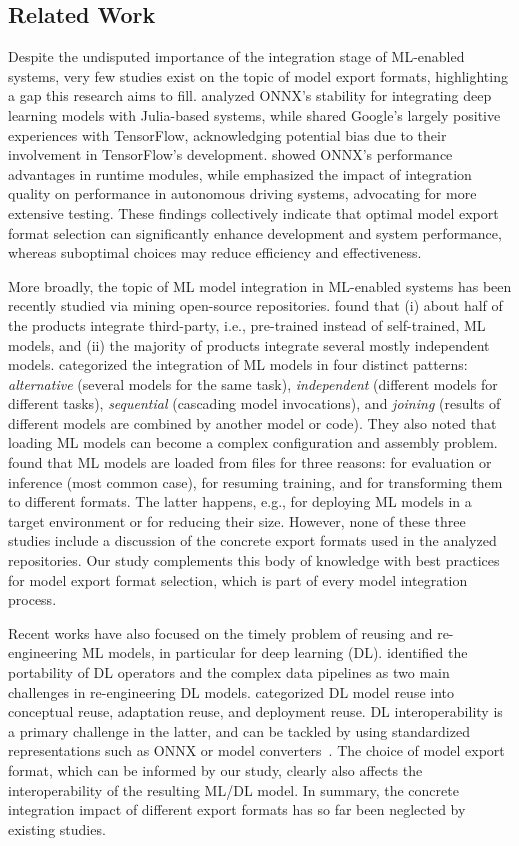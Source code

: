 \subsection{Related Work}
Despite the undisputed importance of the integration stage of ML-enabled systems, very few studies exist on the topic of model export formats, highlighting a gap this research aims to fill.
\citet{shridhar2020onnx} analyzed ONNX's stability for integrating deep learning models with Julia-based systems, while \citet{olston2017tensorflow} shared Google's largely positive experiences with TensorFlow, acknowledging potential bias due to their involvement in TensorFlow's development.
\citet{alizadeh2024green} showed ONNX's performance advantages in runtime modules, while \citet{peng2020first} emphasized the impact of integration quality on performance in autonomous driving systems, advocating for more extensive testing.
These findings collectively indicate that optimal model export format selection can significantly enhance development and system performance, whereas suboptimal choices may reduce efficiency and effectiveness.

More broadly, the topic of ML model integration in ML-enabled systems has been recently studied via mining open-source repositories.
\citet{nahar2024product} found that (i) about half of the products integrate third-party, i.e., pre-trained instead of self-trained, ML models, and (ii) the majority of products integrate several mostly independent models.
\citet{Sens2024} categorized the integration of ML models in four distinct patterns: \textit{alternative} (several models for the same task), \textit{independent} (different models for different tasks), \textit{sequential} (cascading model invocations), and \textit{joining} (results of different models are combined by another model or code). 
They also noted that loading ML models can become a complex configuration and assembly problem. 
\citet{Toma2024} found that ML models are loaded from files for three reasons: for evaluation or inference (most common case), for resuming training, and for transforming them to different formats.
The latter happens, e.g., for deploying ML models in a target environment or for reducing their size.
However, none of these three studies include a discussion of the concrete export formats used in the analyzed repositories.
Our study complements this body of knowledge with best practices for model export format selection, which is part of every model integration process.

Recent works have also focused on the timely problem of reusing and re-engineering ML models, in particular for deep learning (DL).
\citet{Jiang2024} identified the portability of DL operators  and the complex data pipelines as two main challenges in re-engineering DL models.
\citet{Davis2023} categorized DL model reuse into conceptual reuse, adaptation reuse, and deployment reuse.
DL interoperability is a primary challenge in the latter, and can be tackled by using standardized representations such as ONNX or model converters~\cite{Jajal2024}.
The choice of model export format, which can be informed by our study, clearly also affects the interoperability of the resulting ML/DL model.
In summary, the concrete integration impact of different export formats has so far been neglected by existing studies.